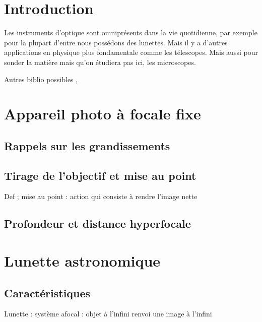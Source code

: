 


\biblio{}

\section*{Introduction}
Les instruments d'optique sont omniprésents dans la vie quotidienne, par exemple pour la plupart d'entre nous possédons des lunettes. Mais il y a d’autres applications en physique plus fondamentale comme les télescopes. Mais aussi pour sonder la matière mais qu'on étudiera pas ici, les microscopes.

Autres biblio possibles \cite{Optique_hecht}, \cite{Optique_perez}


\section{Appareil photo à focale fixe}
\subsection{Rappels sur les grandissements}
\subsection{Tirage de l'objectif et mise au point}
Def ; mise au point : action qui consiste à rendre l'image nette
\subsection{Profondeur et distance hyperfocale}

\section{Lunette astronomique}
\subsection{Caractéristiques}
Lunette : système afocal : objet à l'infini renvoi une image à l'infini
